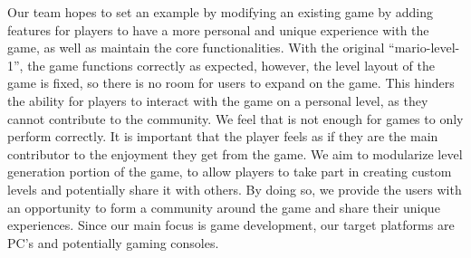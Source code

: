 \documentclass{article}
\begin{document}
    Our team hopes to set an example by modifying an existing game by adding features for players to have a more personal and unique experience with the game, as well as maintain the core functionalities. With the original ``mario-level-1'', the game functions correctly as expected, however, the level layout of the game is fixed, so there is no room for users to expand on the game. This hinders the ability for players to interact with the game on a personal level, as they cannot contribute to the community. We feel that is not enough for games to only perform correctly. It is important that the player feels as if they are the main contributor to the enjoyment they get from the game. We aim to modularize level generation portion of the game, to allow players to take part in creating custom levels and potentially share it with others. By doing so, we provide the users with an opportunity to form a community around the game and share their unique experiences. Since our main focus is game development, our target platforms are PC’s and potentially gaming consoles.
\end{document}

